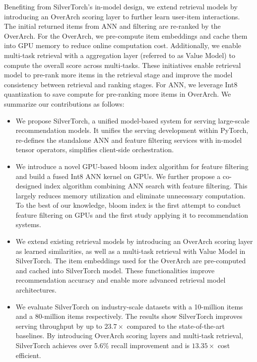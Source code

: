 Benefiting from SilverTorch's in-model design, we extend retrieval models by introducing an OverArch scoring layer to further learn user-item interactions. The initial returned items from ANN and filtering are re-ranked by the OverArch. For the OverArch, we pre-compute item embeddings and cache them into GPU memory to reduce online computation cost. Additionally, we enable multi-task retrieval with a aggregation layer (referred to as Value Model) to compute the overall score across multi-tasks. These initiatives enable retrieval model to pre-rank more items in the retrieval stage and improve the model consistency between retrieval and ranking stages. For ANN, we leverage Int8 quantization to save compute for pre-ranking more items in OverArch.
We summarize our contributions as follows:
\begin{itemize}%
    \item We propose SilverTorch, a unified model-based system for serving large-scale recommendation models. It unifies the serving development within PyTorch, re-defines the standalone ANN and feature filtering services with in-model tensor operators, simplifies client-side orchestration.
    \item We introduce a novel GPU-based bloom index algorithm for feature filtering and build a fused Int8 ANN kernel on GPUs. We further propose a co-designed index algorithm combining ANN search with feature filtering. This largely reduces memory utilization and eliminate unnecessary computation. To the best of our knowledge, bloom index is the first attempt to conduct feature filtering on GPUs and the first study applying it to recommendation systems.
    \item We extend existing retrieval models by introducing an OverArch scoring layer as learned similarities, as well as a multi-task retrieval with Value Model in SilverTorch. The item embeddings used for the OverArch are pre-computed and cached into SilverTorch model. These functionalities improve recommendation accuracy and enable more advanced retrieval model architectures.
    \item We evaluate SilverTorch on industry-scale datasets with a 10-million items and a 80-million items respectively. The results show SilverTorch improves serving throughput by up to $23.7\times$ compared to the state-of-the-art baselines. By introducing OverArch scoring layers and multi-task retrieval, SilverTorch achieves over 5.6\% recall improvement and is $13.35\times$ cost efficient.
\end{itemize}

